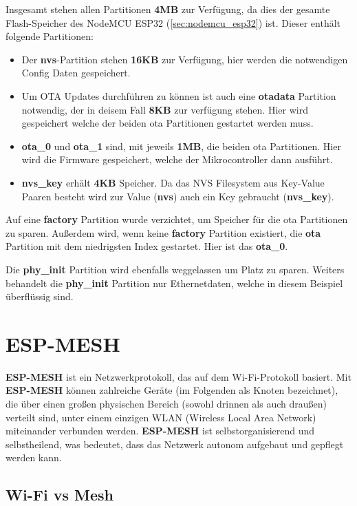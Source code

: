 Insgesamt stehen allen Partitionen \textbf{4MB} zur Verfügung, da dies der gesamte Flash-Speicher des NodeMCU ESP32 (\ref{sec:nodemcu_esp32}) ist. Dieser enthält folgende Partitionen:
\begin{itemize}
    \item Der \textbf{nvs}-Partition stehen \textbf{16KB} zur Verfügung, hier werden die notwendigen Config Daten gespeichert.
    \item Um OTA Updates durchführen zu können ist auch eine \textbf{otadata} Partition notwendig, der in deisem Fall \textbf{8KB} zur verfügung stehen. Hier wird gespeichert welche der beiden ota Partitionen gestartet werden muss.
    \item \textbf{ota\_0} und \textbf{ota\_1} sind, mit jeweils \textbf{1MB}, die beiden ota Partitionen. Hier wird die Firmware gespeichert, welche der Mikrocontroller dann ausführt.
    \item \textbf{nvs\_key} erhält \textbf{4KB} Speicher. Da das NVS Filesystem aus Key-Value Paaren besteht wird zur Value (\textbf{nvs}) auch ein Key gebraucht (\textbf{nvs\_key}).
\end{itemize}

Auf eine \textbf{factory} Partition wurde verzichtet, um Speicher für die ota Partitionen zu sparen. Außerdem wird, wenn keine \textbf{factory} Partition existiert, die \textbf{ota} Partition mit dem niedrigsten Index gestartet. Hier ist das \textbf{ota\_0}.

Die \textbf{phy\_init} Partition wird ebenfalls weggelassen um Platz zu sparen. Weiters behandelt die \textbf{phy\_init} Partition nur Ethernetdaten, welche in diesem Beispiel überflüssig sind.

\section{ESP-MESH}\label{sec:mesh}
\textbf{ESP-MESH} ist ein Netzwerkprotokoll, das auf dem Wi-Fi-Protokoll basiert. Mit \textbf{ESP-MESH} können zahlreiche Geräte (im Folgenden als Knoten bezeichnet), die über einen großen physischen Bereich (sowohl drinnen als auch draußen) verteilt sind, unter einem einzigen WLAN (Wireless Local Area Network) miteinander verbunden werden. \textbf{ESP-MESH} ist selbstorganisierend und selbstheilend, was bedeutet, dass das Netzwerk autonom aufgebaut und gepflegt werden kann.

\subsection{Wi-Fi vs Mesh}

